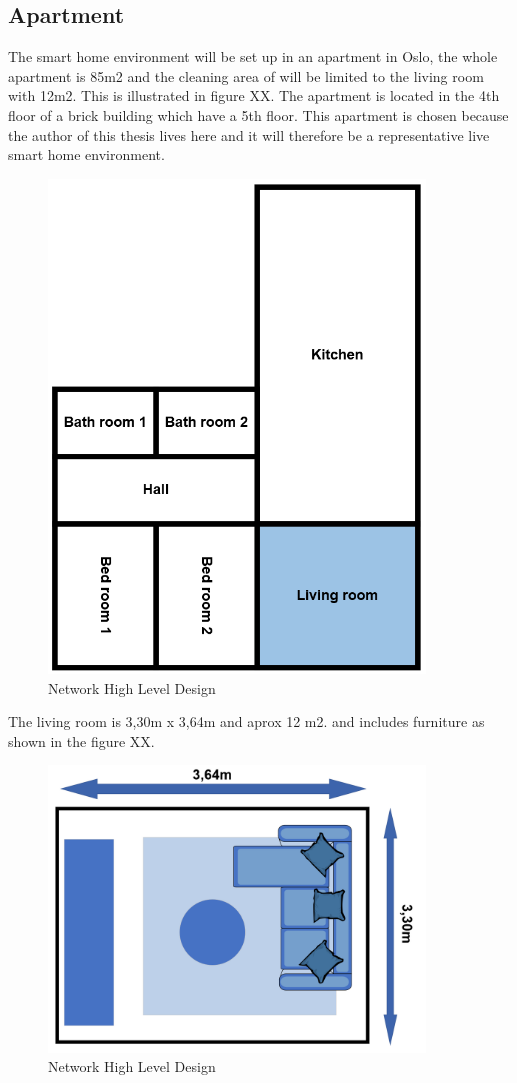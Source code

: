 \subsection{Apartment}
The smart home environment will be set up in an apartment in Oslo, the whole apartment is 85m2 and the cleaning area of will be limited to the living room with 12m2. This is illustrated in figure XX. The apartment is located in the 4th floor of a brick building which have a 5th floor. This apartment is chosen because the author of this thesis lives here and it will therefore be a representative live smart home environment.

\begin{figure}[!ht]
    \centering
    \includegraphics[width=10cm]{figures/Apartment.png}
    \caption{Network High Level Design}
    \label{fig:HLD}
\end{figure}

 The living room is 3,30m x 3,64m and aprox 12 m2. and includes furniture as shown in the figure XX. 

\begin{figure}[!ht]
    \centering
    \includegraphics[width=10cm]{figures/Living room.png}
    \caption{Network High Level Design}
    \label{fig:HLD}
\end{figure}

